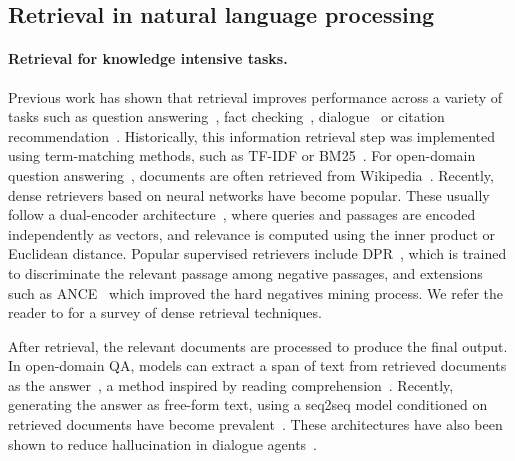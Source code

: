 \documentclass[10pt]{article} \usepackage[preprint]{tmlr}
\begin{document}
\subsection{Retrieval in natural language processing}
\paragraph{Retrieval for knowledge intensive tasks.}
Previous work has shown that retrieval improves performance across a variety of tasks such as question answering~\citep{voorhees1999trec,chen2017reading, kwiatkowski2019natural}, fact checking~\citep{thorne2018fever}, dialogue~\citep{dinan2019wizardofwikipedia} or citation recommendation~\citep{petroni2022improving}.
Historically, this information retrieval step was implemented using term-matching methods, such as TF-IDF or BM25~\citep{jones1972statistical,robertson1995okapi}.
For open-domain question answering~\citep{voorhees1999trec}, documents are often retrieved from Wikipedia~\citep{chen2017reading}.
Recently, dense retrievers based on neural networks have become popular.
These usually follow a dual-encoder architecture~\citep{yih_learning_2011,huang2013learning,shen2014learning}, where queries and passages are encoded independently as vectors, and relevance is computed using the inner product or Euclidean distance.
Popular supervised retrievers include DPR~\citep{karpukhin2020dense}, which is trained to discriminate the relevant passage among negative passages, and extensions such as ANCE~\citep{xiong2020approximate} which improved the hard negatives mining process.
We refer the reader to \citet{yates_pretrained_2021} for a survey of dense retrieval techniques.

After retrieval, the relevant documents are processed to produce the final output.
In open-domain QA, models can extract a span of text from retrieved documents as the answer~\citep{chen2017reading, clark2017simple, wang2019multi, karpukhin2020dense}, a method inspired by reading comprehension~\citep{richardson_mctest:_2013,rajpurkar2016squad}.
Recently, generating the answer as free-form text, using a seq2seq model conditioned on retrieved documents have become prevalent~\citep{lewis2020retrieval,izacard2020leveraging,min2020ambigqa}.
These architectures have also been shown to reduce hallucination in dialogue agents~\citep{shuster2021retrieval}.
\end{document}
